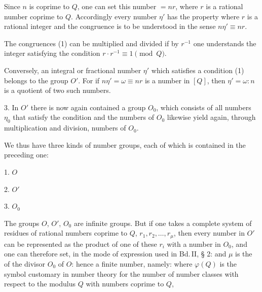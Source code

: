 Since $n$ is coprime to $Q$, one can set this number $= nr$,
where $r$ is a rational number coprime to $Q$. Accordingly every number $\eta'$ has the property
where $r$ is a rational integer and the congruence is to be
understood in the sense $n\eta' \equiv nr$.

The congruences (1) can be multiplied and divided
if by $r^{-1}$ one understands the integer satisfying the condition $r \cdot r^{-1} \equiv 1 \pmod{Q}$.

Conversely, an integral or fractional number $\eta'$ which
satisfies a condition (1) belongs to the group $O'$. For if
$n\eta' = \omega \equiv nr$ is a number in $[Q]$, then $\eta' = \omega : n$ is a quotient
of two such numbers.

3. In $O'$ there is now again contained a group $O_0$, which consists
of all numbers $\eta_0$ that satisfy the condition
and the numbers of $O_0$ likewise yield again, through multiplication
and division, numbers of $O_0$.

We thus have three kinds of number groups, each of which is contained
in the preceding one:

1. $O$ 

2. $O'$ 

3. $O_0$ 

The groups $O$, $O'$, $O_0$ are infinite  groups.
But if one takes a complete system of residues of rational numbers coprime
 to $Q$, $r_1, r_2, \ldots, r_\mu$, then every number in $O'$ can be represented as the product
of one of these $r_i$ with a number in $O_0$, and one
can therefore set, in the mode of expression used in Bd.\,II, § 2:
and $\mu$ is the  of the divisor $O_0$ of $O$: %
hence a finite number, namely:
where $\varphi(Q)$ is the symbol customary in number theory for
the number of number classes with respect to the modulus $Q$ with numbers coprime to $Q$,
